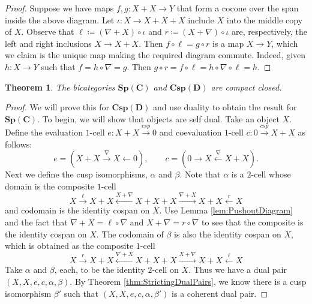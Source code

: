 \documentclass[11pt]{amsart}
\newcommand{\from}{\colon}
\newcommand{\xto}[1]{\xrightarrow{#1}}
\newcommand{\tocospan}{\xrightarrow{\mathit{csp}}}
\newcommand{\bispmap}[1]{\mathbf{Sp(#1)}}
\newcommand{\bicspmap}[1]{\mathbf{Csp(#1)}}
\newtheorem{thm}{Theorem}[section]
\theoremstyle{remark}
\theoremstyle{definition}
\begin{document}
\begin{proof}
	Suppose we have maps $f,g \from X+X \to Y$ that form a cocone over the span inside the above diagram. Let $\iota \from X \to X+X+X$ include $X$ into the middle copy of $X$. Observe that $\ell \coloneqq (\nabla + X) \circ \iota$ and $r \coloneqq (X + \nabla) \circ \iota$ are, respectively, the left and right inclusions $X \to X+X$. Then $f \circ \ell = g \circ r$ is a map $X \to Y$, which we claim is the unique map making the required diagram commute. Indeed, given $h \from X \to Y$ such that $f = h \circ \nabla = g$.  Then $g \circ r = f \circ \ell = h \circ \nabla \circ \ell = h$.
\end{proof}

\begin{thm}
	\label{thm:SpansMapsAreCCBicat}
	The bicategories $\bispmap{C}$ and $\bicspmap{D}$ are compact closed.
\end{thm}

\begin{proof}
	We will prove this for $\bicspmap{D}$ and use duality to obtain the result for $\bispmap{C}$. To begin, we will show that objects are self dual. Take an object $X$.  Define the evaluation $1$-cell $e \from X + X \tocospan 0$ and coevaluation $1$-cell $c \from 0 \tocospan X+X$ as follows:
	\[
		e = (X+X \xto{\nabla} X \gets 0), \quad \quad 
		c = (0 \to X \xleftarrow{\nabla} X+X).
	\]
	Next we define the cusp isomorphisms, $\alpha$ and $\beta$.
	Note that $\alpha$ is a $2$-cell whose domain is the composite $1$-cell
	\[
		X \xto{\ell}
		X+X \xleftarrow{X+\nabla}
		X+X+X \xto{\nabla +X}
		X+X \xleftarrow{r}
		X
	\]
	and codomain is the identity cospan on $X$.  Use Lemma \ref{lem:PushoutDiagram} and the fact that $\nabla+X = \ell \circ \nabla$ and $X + \nabla = r \circ \nabla$ to see that the composite is the identity cospan on $X$.  The codomain of $\beta$ is also the identity cospan on $X$, which is obtained as the composite $1$-cell
	\[
		X \xto{r}
		X+X \xleftarrow{\nabla+X}
		X+X+X \xto{X+\nabla}
		X+X \xleftarrow{\ell}
		X
	\]
	Take $\alpha$ and $\beta$, each, to be the identity $2$-cell on $X$. Thus we have a dual pair $(X,X,e,c,\alpha,\beta)$. By Theorem \ref{thm:StrictingDualPairs}, we know there is a cusp isomorphism $\beta'$ such that $(X,X,e,c,\alpha,\beta')$ is a coherent dual pair.  
\end{proof}



\end{document}
